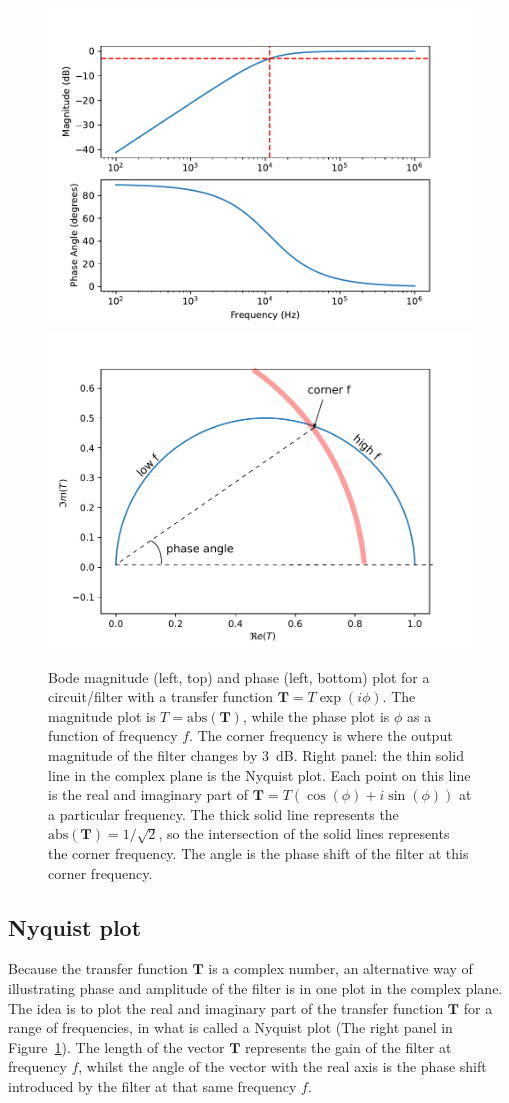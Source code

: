 \documentclass{article}
\begin{document}
\begin{figure}
  \centering
  \includegraphics[width=0.49\columnwidth]{images/bodeplot} \hfill
  \includegraphics[width=0.49\columnwidth]{images/nyquist_annotated}
  \caption{Bode magnitude (left, top) and phase (left, bottom) plot
    for a circuit/filter with a transfer function
    $\mathbf{T}= T\exp{(i\phi)}$. The magnitude plot is
    $T=\mbox{abs}(\mathbf{T})$, while the phase plot is $\phi$ as a
    function of frequency $f$. The corner frequency is where the
    output magnitude of the filter changes by 3~dB. Right panel: the thin
    solid line in the complex plane is the Nyquist plot. Each point on
    this line is the real and imaginary part of
    $\mathbf{T} = T(\cos(\phi)+ i \sin(\phi))$ at a particular
    frequency. The thick solid line represents the
    $\mbox{abs}(\mathbf{T})=1/\sqrt{2}$, so the intersection of the
    solid lines represents the corner frequency. The angle is the
    phase shift of the filter at this corner frequency.}
  \label{fig:bodenyquist}
\end{figure}

\subsection*{Nyquist plot}
Because the transfer function $\mathbf{T}$ is a complex number, an
alternative way of illustrating phase and amplitude of the filter is
in one plot in the complex plane. The idea is to plot the real and
imaginary part of the transfer function $\mathbf{T}$ for a range of
frequencies, in what is called a Nyquist plot (The right panel in
Figure~\ref{fig:bodenyquist}). The length of the vector $\mathbf{T}$
represents the gain of the filter at frequency $f$, whilst the angle
of the vector with the real axis is the phase shift introduced by the
filter at that same frequency $f$.
\end{document}
